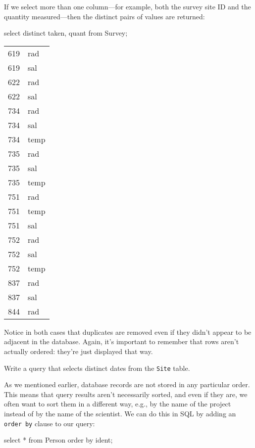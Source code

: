 \documentclass{book}
\begin{document}
If we select more than one column---for example, both the survey site ID
and the quantity measured---then the distinct pairs of values are
returned:

\begin{VerbIn}
select distinct taken, quant from Survey;
\end{VerbIn}

\begin{tabular}{ll}
619 & rad \\
619 & sal \\
622 & rad \\
622 & sal \\
734 & rad \\
734 & sal \\
734 & temp \\
735 & rad \\
735 & sal \\
735 & temp \\
751 & rad \\
751 & temp \\
751 & sal \\
752 & rad \\
752 & sal \\
752 & temp \\
837 & rad \\
837 & sal \\
844 & rad \\
\end{tabular}

Notice in both cases that duplicates are removed even if they didn't
appear to be adjacent in the database. Again, it's important to remember
that rows aren't actually ordered: they're just displayed that way.

\begin{challenge}
  Write a query that selects distinct dates from the \texttt{Site}
  table.
\end{challenge}

As we mentioned earlier, database records are not stored in any
particular order. This means that query results aren't necessarily
sorted, and even if they are, we often want to sort them in a different
way, e.g., by the name of the project instead of by the name of the
scientist. We can do this in SQL by adding an \texttt{order by} clause
to our query:

\begin{VerbIn}
select * from Person order by ident;
\end{VerbIn}
\end{document}
